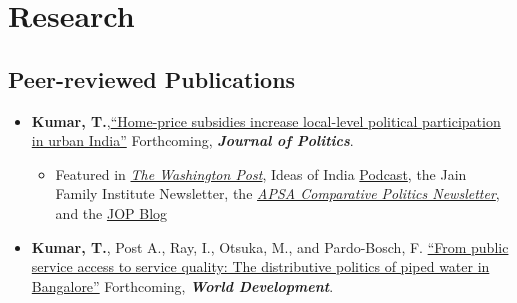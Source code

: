 \documentclass[11pt]{article}
\begin{document}
	
\vspace{2mm}
\color{MidnightBlue}

\section*{Research}
\color{Black}


\subsection*{Peer-reviewed Publications}
\begin{itemize}
	



			\item[] \textbf{Kumar, T.},\href{https://doi.org/10.1086/715605}{``Home-price subsidies increase local-level political participation in urban India''} Forthcoming, \textit{\textbf{Journal of Politics}}.
			\begin{itemize}[nosep]
			\item Featured in \href{https://www.washingtonpost.com/news/monkey-cage/wp/2019/01/31/heres-what-gavin-newsom-elizabeth-warren-and-microsoft-should-know-if-want-to-end-the-affordable-housing-crisis/?tid=sm_tw_cage}{\textit{The Washington Post}},  Ideas of India \href{https://www.discoursemagazine.com/politics/2020/12/24/ideas-of-india-how-does-subsidizing-housing-prices-shape-political-behavior}{Podcast},  the Jain Family Institute Newsletter, the \href{https://www.comparativepoliticsnewsletter.org/wp-content/uploads/2020/05/Spring-Newsletter-2020.pdf}{\textit{APSA Comparative Politics Newsletter}}, and the \href{https://jop.blogs.uni-hamburg.de/home-price-subsidies-increase-local-level-political-participation-in-urban-india/}{JOP Blog}  			\end{itemize}
			\item[] \textbf{Kumar, T.}, Post A., Ray, I., Otsuka, M., and Pardo-Bosch, F. \href{https://t.co/v44FAya9XY?amp=1}{``From public service access to service quality: The distributive politics of piped water in Bangalore''} Forthcoming, \textbf{\textit{World Development}}.
	


\end{itemize}
\end{document}
